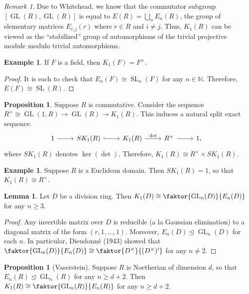 \documentclass[10pt,letterpaper,cm]{nupset}
\theoremstyle{definition}
\newtheorem{exmp}[definition]{Example}
\theoremstyle{theorem}
\newtheorem{lemma}[theorem]{Lemma}
\newtheorem{prop}[theorem]{Proposition}
\theoremstyle{remark}
\newtheorem{remark}{Remark}
\newcommand{\N}{\mathbb N}
\newcommand{\1}{\mathbf{1}}
\newcommand{\0}{\vec 0}
\DeclareMathOperator*{\GL}{GL}
\DeclareMathOperator*{\SL}{SL}
\begin{document}
\begin{remark}
Due to Whitehead, we know that the commutator subgroup $[\GL(R), \GL(R)]$ is equal to $E(R) = \bigcup_n E_n(R)$, the group of elementary matrices $E_{i, j}(r)$ where $r \in R$ and $i\ne j$. Thus, $K_1(R)$ can be viewed as the ``stabilized'' group of automorphisms of the trivial projective module modulo trivial automorphisms.
\end{remark}

\begin{exmp}
If $F$ is a field, then $K_1(F) = F^{\times}$.
\end{exmp}
\begin{proof}
It is each to check that $E_n(F) \cong \SL_n(F)$ for any $n\in \N$. Therefore, $E(F) \cong \SL(R)$.
\end{proof}

\begin{prop}
Suppose $R$ is commutative. Consider the sequence $R^{\times} \cong \GL(1, R) \to \GL(R) \to K_1(R)$. This induces a natural split exact sequence.
\[
\begin{tikzcd}
1 \arrow[r] & SK_1(R) \arrow[r, hook] & K_1(R) \arrow[r, "\det"] & R^{\times} \arrow[r] & 1,
\end{tikzcd}
\]
where $SK_1(R)$ denotes $\ker(\det)$. Therefore, $K_1(R) \cong R^{\times} \times SK_1(R)$.
\end{prop}

\begin{exmp}
Suppose $R$ is a Euclidean domain. Then $SK_1(R) =1$, so that $K_1(R) \cong R^{\times}$.
\end{exmp}

\begin{lemma}
Let $D$ be a division ring. Then $K_1(D) \cong \faktor{\GL_n(D)}{E_n(D)}$ for any $n\geq 3$.
\end{lemma}
\begin{proof}
Any invertible matrix over $D$ is reducible (a la Gaussian elimination) to a diagonal matrix of the form $(r, 1, \ldots, 1)$. Moreover, $E_n(D)\unlhd \GL_n(D)$ for each $n$. In particular, Dieudonn\'e (1943) showed that  $\faktor{\GL_n(D)}{E_n(D)} \cong \faktor{D^{\times}}{(D^{\times})'}$ for any $n\ne 2$. 
\end{proof}

\begin{prop}[Vaserstein]
Suppose $R$ is Noetherian of dimension $d$, so that $E_n(R)\unlhd \GL_n(R)$ for any $n\geq d+2$. Then $K_1(R) \cong \faktor{\GL_n(R)}{E_n(R)}$ for any $n \geq d+2$. 
\end{prop}
\end{document}
